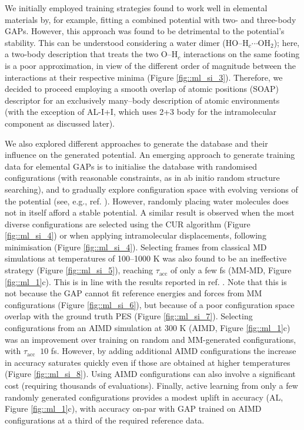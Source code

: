 \documentclass[../../main.tex]{subfiles}
\newcommand{\taua}{$\tau_\text{acc}$ }
\begin{document}
We initially employed training strategies found to work well in elemental materials by, for example, fitting a combined potential with two- and three-body GAPs. However, this approach was found to be detrimental to the potential’s stability. This can be understood considering a water dimer (HO–H${}_c \cdots$OH${}_2$); here, a two-body description that treats the two O–H${}_c$ interactions on the same footing is a poor approximation, in view of the different order of magnitude between the interactions at their respective minima (Figure \ref{fig::ml_si_3}). Therefore, we decided to proceed employing a smooth overlap of atomic positions\cite{Bartok2013} (SOAP) descriptor for an exclusively many–body description of atomic environments (with the exception of AL-I+I, which uses 2+3 body for the intramolecular component as discussed later). 

We also explored different approaches to generate the database and their influence on the generated potential. An emerging approach to generate training data for elemental GAPs is to initialise the database with randomised configurations (with reasonable constraints, as in ab initio random structure searching\cite{Pickard2011}), and to gradually explore configuration space with evolving versions of the potential (see, e.g., ref. \cite{Bernstein2019}). However, randomly placing water molecules does not in itself afford a stable potential. A similar result is observed when the most diverse configurations are selected using the CUR algorithm\cite{Mahoney2009, Bernstein2019} (Figure \ref{fig::ml_si_4}) or when applying intramolecular displacements, following minimisation (Figure \ref{fig::ml_si_4}). Selecting frames from classical MD simulations at temperatures of 100–1000 K was also found to be an ineffective strategy (Figure \ref{fig::ml_si_5}), reaching \taua of only a few fs (MM-MD, Figure \ref{fig::ml_1}c). This is in line with the results reported in ref. \cite{Cole2020}. Note that this is not because the GAP cannot fit reference energies and forces from
MM configurations (Figure \ref{fig::ml_si_6}), but because of a poor configuration space overlap with the ground truth PES (Figure \ref{fig::ml_si_7}). Selecting configurations from an AIMD simulation at 300 K (AIMD, Figure \ref{fig::ml_1}c) was an improvement over training on random and MM-generated configurations, with \taua $~10$ fs. However, by adding additional AIMD configurations the increase in accuracy saturates quickly even if those are obtained at higher temperatures (Figure \ref{fig::ml_si_8}). Using AIMD configurations can also involve a significant cost (requiring thousands of evaluations). Finally, active learning from only a few randomly generated configurations provides a modest uplift in accuracy (AL, Figure \ref{fig::ml_1}c), with accuracy on-par with GAP trained on AIMD configurations at a third of the required reference data.
\end{document}
